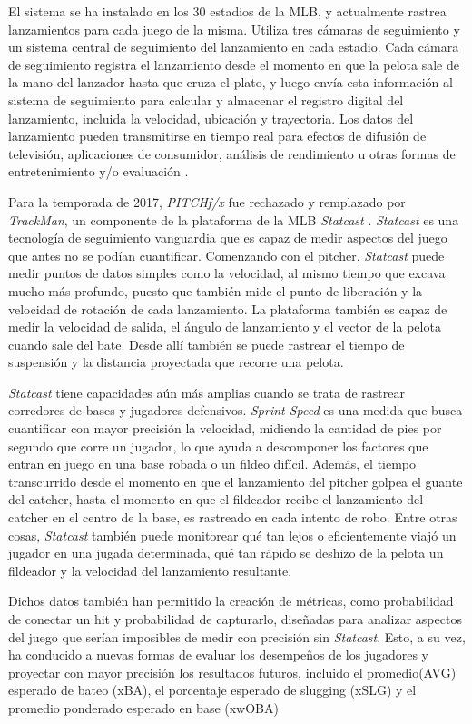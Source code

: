 El sistema se ha instalado en los 30 estadios de la MLB, y actualmente rastrea lanzamientos para cada juego de la misma. Utiliza tres cámaras de seguimiento y un sistema central de seguimiento del lanzamiento en cada estadio. Cada cámara de seguimiento registra el lanzamiento desde el momento en que la pelota sale de la mano del lanzador hasta que cruza el plato, y luego envía esta información al sistema de seguimiento para calcular y almacenar el registro digital del lanzamiento, incluida la velocidad, ubicación y trayectoria. Los datos del lanzamiento pueden transmitirse en tiempo real para efectos de difusión de televisión, aplicaciones de consumidor, análisis de rendimiento u otras formas de entretenimiento y/o evaluación \cite{PITCHf/xSportvision}.

Para la temporada de 2017, \textit{PITCHf/x} fue rechazado y remplazado por \textit{TrackMan}, un componente de la plataforma de la MLB \textit{Statcast} \cite{Statcast}. \textit{Statcast} es una tecnología de seguimiento vanguardia que es capaz de medir aspectos del juego que antes no se podían cuantificar. Comenzando con el pitcher, \textit{Statcast} puede medir puntos de datos simples como la velocidad, al mismo tiempo que excava mucho más profundo, puesto que también mide el punto de liberación y la velocidad de rotación de cada lanzamiento. La plataforma también es capaz de medir la velocidad de salida, el ángulo de lanzamiento y el vector de la pelota cuando sale del bate. Desde allí también se puede rastrear el tiempo de suspensión y la distancia proyectada que recorre una pelota.

\textit{Statcast} tiene capacidades aún más amplias cuando se trata de rastrear corredores de bases y jugadores defensivos. \textit{Sprint Speed} \cite{SprintSpeed} es una medida que busca cuantificar con mayor precisión la velocidad, midiendo la cantidad de pies por segundo que corre un jugador, lo que ayuda a descomponer los factores que entran en juego en una base robada o un fildeo difícil. Además, el tiempo transcurrido desde el momento en que el lanzamiento del pitcher golpea el guante del catcher, hasta el momento en que el fildeador recibe el lanzamiento del catcher en el centro de la base, es rastreado en cada intento de robo. Entre otras cosas, \textit{Statcast} también puede monitorear qué tan lejos o eficientemente viajó un jugador en una jugada determinada, qué tan rápido se deshizo de la pelota un fildeador y la velocidad del lanzamiento resultante.

Dichos datos también han permitido la creación de métricas, como probabilidad de conectar un hit y probabilidad de capturarlo, diseñadas para analizar aspectos del juego que serían imposibles de medir con precisión sin \textit{Statcast}. Esto, a su vez, ha conducido a nuevas formas de evaluar los desempeños de los jugadores y proyectar con mayor precisión los resultados futuros, incluido el promedio(AVG) esperado de bateo (xBA), el porcentaje esperado de slugging (xSLG) y el promedio ponderado esperado en base (xwOBA)

